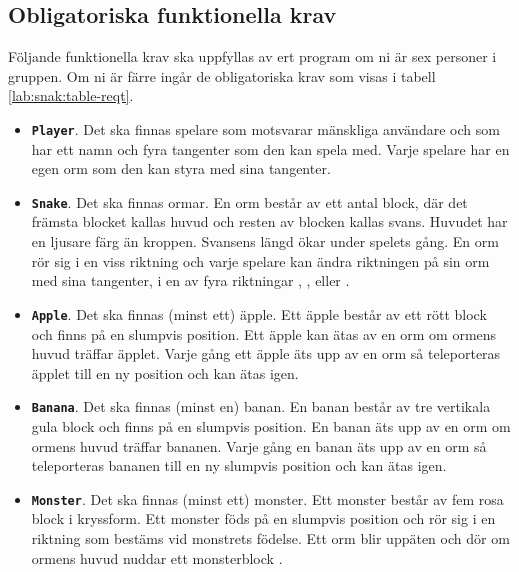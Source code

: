 \subsection{Obligatoriska funktionella krav}

Följande funktionella krav ska uppfyllas av ert program om ni är sex personer i gruppen. Om ni är färre ingår de obligatoriska krav som visas i tabell \ref{lab:snak:table-reqt}.
\begin{itemize}[nosep, label={$\square$},]
\item \textbf{\texttt{Player}}. Det ska finnas spelare som motsvarar mänskliga användare och som har ett namn och fyra tangenter som den kan spela med. Varje spelare har en egen orm som den kan styra med sina tangenter.

\item \textbf{\texttt{Snake}}. Det ska finnas ormar. En orm består av ett antal block, där det främsta blocket kallas huvud och resten av blocken kallas svans. Huvudet har en ljusare färg än kroppen. Svansens längd ökar under spelets gång. En orm rör sig i en viss riktning och varje spelare kan ändra riktningen på sin orm med sina tangenter, i en av fyra riktningar , ,  eller .

\item \textbf{\texttt{Apple}}. Det ska finnas (minst ett) äpple. Ett äpple består av ett rött block och finns på en slumpvis position. Ett äpple kan ätas av en orm om ormens huvud träffar äpplet. Varje gång ett äpple äts upp av en orm så teleporteras äpplet till en ny position och kan ätas igen.

\item \textbf{\texttt{Banana}}. Det ska finnas (minst en) banan. En banan består av tre vertikala gula block och finns på en slumpvis position. En banan äts upp av en orm om ormens huvud träffar bananen. Varje gång en banan äts upp av en orm så teleporteras bananen till en ny slumpvis position och kan ätas igen.

\item \textbf{\texttt{Monster}}. Det ska finnas (minst ett) monster. Ett monster består av fem rosa block i kryssform.  Ett monster föds på en slumpvis position och rör sig i en riktning som bestäms vid monstrets födelse. Ett orm blir uppäten och dör om ormens huvud nuddar ett monsterblock .


\end{itemize}

